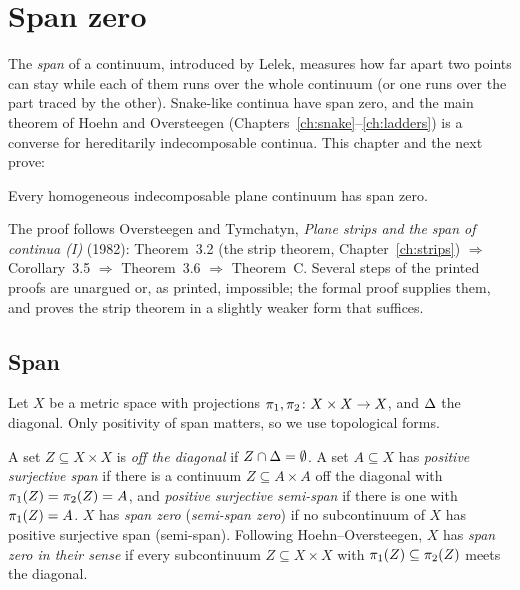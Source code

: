 \chapter{Span zero}\label{ch:span}

The \emph{span} of a continuum, introduced by Lelek, measures how far apart two points can stay while each of them runs
over the whole continuum (or one runs over the part traced by the other). Snake-like continua have span zero, and the
main theorem of Hoehn and Oversteegen (Chapters~\ref{ch:snake}--\ref{ch:ladders}) is a converse for hereditarily
indecomposable continua. This chapter and the next prove:

\begin{theorem}\label{thm:theoremC}
Every homogeneous indecomposable plane continuum has span zero.
\end{theorem}


The proof follows Oversteegen and Tymchatyn, \emph{Plane strips and the span of continua (I)} (1982): Theorem~3.2 (the strip
theorem, Chapter~\ref{ch:strips}) $\Rightarrow$ Corollary~3.5 $\Rightarrow$ Theorem~3.6 $\Rightarrow$ Theorem~C. Several
steps of the printed proofs are unargued or, as printed, impossible; the formal proof supplies them, and proves the strip
theorem in a slightly weaker form that suffices.

\section{Span}

Let $X$ be a metric space with projections $\pi_{1},\pi_{2}\colon X\times X\to X$, and $\Delta$ the diagonal. Only positivity of span matters,
so we use topological forms.

\begin{definition}\label{def:span}
A set $Z\subseteq X\times X$ is \emph{off the diagonal} if $Z\cap\Delta=\emptyset$. A set $A\subseteq X$ has \emph{positive surjective span} if there is a
continuum $Z\subseteq A\times A$ off the diagonal with $\pi_{1}(Z)=\pi_{2}(Z)=A$, and \emph{positive surjective semi-span} if there is one with $\pi_{1}(Z)=A$.
$X$ has \emph{span zero} (\emph{semi-span zero}) if no subcontinuum of $X$ has positive surjective span (semi-span). Following
Hoehn--Oversteegen, $X$ has \emph{span zero in their sense} if every subcontinuum $Z\subseteq X\times X$ with $\pi_{1}(Z)\subseteq\pi_{2}(Z)$ meets the diagonal.
\end{definition}

